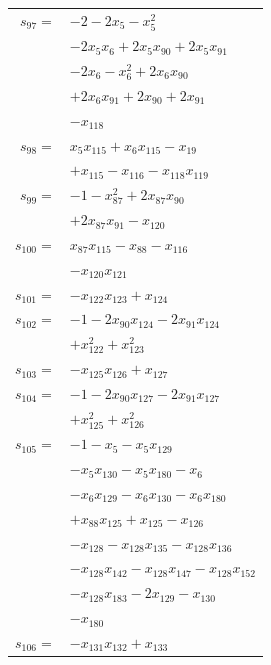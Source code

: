 \begin{longtable}{@{}r@{\;}l@{}}
\(s_{97}=\) & \(\displaystyle -2 -2x_{5} -x_{5}^{2}\) \\
 & \(\displaystyle -2x_{5}x_{6} +2x_{5}x_{90} +2x_{5}x_{91}\) \\
 & \(\displaystyle -2x_{6} -x_{6}^{2} +2x_{6}x_{90}\) \\
 & \(\displaystyle +2x_{6}x_{91} +2x_{90} +2x_{91}\) \\
 & \(\displaystyle -x_{118}\) \\[3pt]
\(s_{98}=\) & \(\displaystyle x_{5}x_{115} +x_{6}x_{115} -x_{19}\) \\
 & \(\displaystyle +x_{115} -x_{116} -x_{118}x_{119}\) \\[3pt]
\(s_{99}=\) & \(\displaystyle -1 -x_{87}^{2} +2x_{87}x_{90}\) \\
 & \(\displaystyle +2x_{87}x_{91} -x_{120}\) \\[3pt]
\(s_{100}=\) & \(\displaystyle x_{87}x_{115} -x_{88} -x_{116}\) \\
 & \(\displaystyle -x_{120}x_{121}\) \\[3pt]
\(s_{101}=\) & \(\displaystyle -x_{122}x_{123} +x_{124}\) \\[3pt]
\(s_{102}=\) & \(\displaystyle -1 -2x_{90}x_{124} -2x_{91}x_{124}\) \\
 & \(\displaystyle +x_{122}^{2} +x_{123}^{2}\) \\[3pt]
\(s_{103}=\) & \(\displaystyle -x_{125}x_{126} +x_{127}\) \\[3pt]
\(s_{104}=\) & \(\displaystyle -1 -2x_{90}x_{127} -2x_{91}x_{127}\) \\
 & \(\displaystyle +x_{125}^{2} +x_{126}^{2}\) \\[3pt]
\(s_{105}=\) & \(\displaystyle -1 -x_{5} -x_{5}x_{129}\) \\
 & \(\displaystyle -x_{5}x_{130} -x_{5}x_{180} -x_{6}\) \\
 & \(\displaystyle -x_{6}x_{129} -x_{6}x_{130} -x_{6}x_{180}\) \\
 & \(\displaystyle +x_{88}x_{125} +x_{125} -x_{126}\) \\
 & \(\displaystyle -x_{128} -x_{128}x_{135} -x_{128}x_{136}\) \\
 & \(\displaystyle -x_{128}x_{142} -x_{128}x_{147} -x_{128}x_{152}\) \\
 & \(\displaystyle -x_{128}x_{183} -2x_{129} -x_{130}\) \\
 & \(\displaystyle -x_{180}\) \\[3pt]
\(s_{106}=\) & \(\displaystyle -x_{131}x_{132} +x_{133}\) \\[3pt]

\end{longtable}
